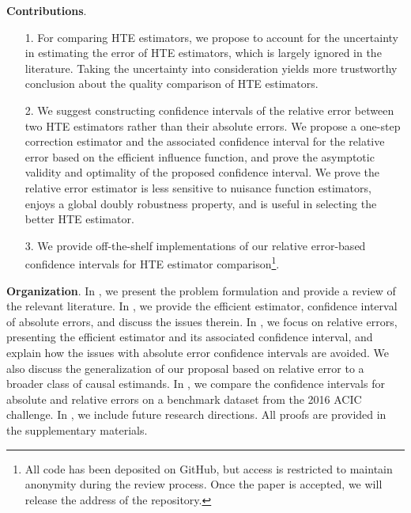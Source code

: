 \documentclass[twoside]{article}
\newcommand{\1}{{\mathbbm{1}}}
\begin{document}
\noindent\textbf{Contributions}. 
\begin{itemize}
    \item [1.] For comparing HTE estimators, we propose to account for the uncertainty in estimating the error of HTE estimators, which is largely ignored in the literature. Taking the uncertainty into consideration yields more trustworthy conclusion about the quality comparison of HTE estimators.
    \item [2.] We suggest constructing confidence intervals of the relative error between two HTE estimators rather than their absolute errors. 
    We propose a one-step correction estimator and the associated confidence interval for the relative error based on the efficient influence function, and prove the asymptotic validity and optimality of the proposed confidence interval. 
    We prove the relative error estimator is less sensitive to nuisance function estimators, enjoys a global doubly robustness property, and is useful in selecting the better HTE estimator.

    \item [3.] We provide off-the-shelf implementations of our relative error-based confidence intervals for HTE estimator comparison\footnote{All code has been deposited on GitHub, but access is restricted to maintain anonymity during the review process. Once the paper is accepted, we will release the address of the repository.}.
\end{itemize}

\noindent\textbf{Organization}.
In , we present the problem formulation and provide a review of the relevant literature. 
In , we provide the efficient estimator, confidence interval of absolute errors, and discuss the issues therein.
In , we focus on relative errors, presenting the efficient estimator and its associated confidence interval, and explain how the issues with absolute error confidence intervals are avoided.
We also discuss the generalization of our proposal based on relative error to a broader class of causal estimands. 
In , we compare the confidence intervals for absolute and relative errors on a benchmark dataset from the 2016 ACIC challenge. 
In , we include future research directions. 
All proofs are provided in the supplementary materials.
\end{document}
